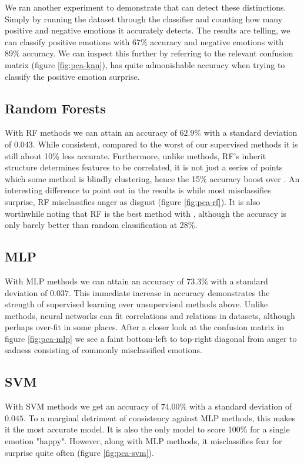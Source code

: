 We ran another experiment to demonstrate that \knn can detect these distinctions. Simply by running the dataset through the \knn classifier and counting how many positive and negative emotions it accurately detects. The results are telling, we can classify positive emotions with 67\% accuracy and negative emotions with 89\% accuracy. We can inspect this further by referring to the relevant confusion matrix (figure \ref{fig:pca-knn}), \knn has quite admonishable accuracy when trying to classify the positive emotion surprise.

\subsection{Random Forests}

With RF methods we can attain an accuracy of $62.9\%$ with a standard deviation of $0.043$. While consistent, compared to the worst of our supervised methods it is still about 10\% less accurate. Furthermore, unlike \knn methods, RF's inherit structure determines features to be correlated, it is not just a series of points which some method is blindly clustering, hence the 15\% accuracy boost over \knn. An interesting difference to point out in the results is while \knn most misclassifies surprise, RF misclassifies anger as disgust (figure \ref{fig:pca-rf}). It is also worthwhile noting that RF is the best method with \tsne, although the accuracy is only barely better than random classification at 28\%.

\subsection{MLP}

With MLP methods we can attain an accuracy of $73.3\%$ with a standard deviation of $0.037$. This immediate increase in accuracy demonstrates the strength of supervised learning over unsupervised methods above. Unlike \knn methods, neural networks can fit correlations and relations in datasets, although perhaps over-fit in some places. After a closer look at the confusion matrix in figure \ref{fig:pca-mlp} we see a faint bottom-left to top-right diagonal from anger to sadness consisting of commonly misclassified emotions.

\subsection{SVM}

With SVM methods we get an accuracy of $74.00\%$ with a standard deviation of $0.045$. To a marginal detriment of consistency against MLP methods, this makes it the most accurate model. It is also the only model to score 100\% for a single emotion "happy". However, along with MLP methods, it misclassifies fear for surprise quite often (figure \ref{fig:pca-svm}).

